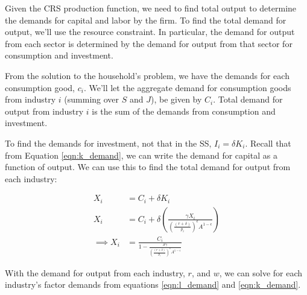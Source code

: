 \documentclass[letterpaper,12pt]{article}
\theoremstyle{definition}
\begin{document}
\begin{spacing}{1.5}
Given the CRS production function, we need to find total output to determine the demands for capital and labor by the firm.  To find the total demand for output, we'll use the resource constraint.  In particular, the demand for output from each sector is determined by the demand for output from that sector for consumption and investment.

From the solution to the household's problem, we have the demands for each consumption good, $c_{i}$.  We'll let the aggregate demand for consumption goods from industry $i$ (summing over $S$ and $J$), be given by $C_{i}$.  Total demand for output from industry $i$ is the sum of the demands from consumption and investment.

To find the demands for investment, not that in the SS, $I_{i}=\delta K_{i}$.  Recall that from Equation \ref{eqn:k_demand}, we can write the demand for capital as a function of output.  We can use this to find the total demand for output from each industry:

\begin{equation}
\label{eqn:find_output}
\begin{split}
X_{i} &= C_{i} + \delta K_{i} \\
X_{i} &= C_{i} + \delta \left(\frac{\gamma X_{i}}{\left(\frac{(r+\delta)}{p_{i}}\right)^{\epsilon}A^{1-\epsilon}} \right)\\
\implies X_{i} &= \frac{C_{i}}{1-\frac{\delta \gamma}{\left(\frac{(r+\delta)}{p_{i}}\right)^{\epsilon}A^{1-\epsilon}}}
\end{split}
\end{equation}  

With the demand for output from each industry, $r$, and $w$, we can solve for each industry's factor demands from equations \ref{eqn:l_demand} and \ref{eqn:k_demand}.


\end{spacing}
\end{document}
